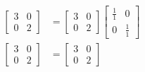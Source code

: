 \documentclass[twoside,10pt]{article}
\begin{document}
\begin{enumerate}
\begin{align*}
\begin{bmatrix} 3 & 0 \\ 0 & 2 \end{bmatrix} &= \begin{bmatrix} 3 & 0 \\ 0&2 \end{bmatrix} \begin{bmatrix} \frac 1 1 & 0 \\ 0 & \frac 1 1 \end{bmatrix} \\
\begin{bmatrix} 3 & 0 \\ 0 & 2 \end{bmatrix} &= \begin{bmatrix} 3 & 0 \\ 0&2 \end{bmatrix}
\end{align*}


\end{enumerate}
\end{document}

